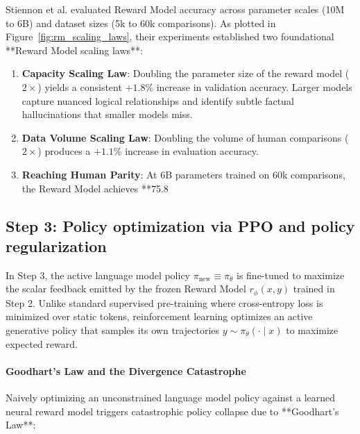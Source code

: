 \documentclass[../../main.tex]{subfiles}
\begin{document}
Stiennon et al. evaluated Reward Model accuracy across parameter scales (10M to 6B) and dataset sizes (5k to 60k comparisons). As plotted in Figure~\ref{fig:rm_scaling_laws}, their experiments established two foundational **Reward Model scaling laws**:
\begin{enumerate}
    \item \textbf{Capacity Scaling Law}: Doubling the parameter size of the reward model ($2\times$) yields a consistent $\mathbf{+1.8\%}$ increase in validation accuracy. Larger models capture nuanced logical relationships and identify subtle factual hallucinations that smaller models miss.
    \item \textbf{Data Volume Scaling Law}: Doubling the volume of human comparisons ($2\times$) produces a $\mathbf{+1.1\%}$ increase in evaluation accuracy.
    \item \textbf{Reaching Human Parity}: At 6B parameters trained on 60k comparisons, the Reward Model achieves **75.8%
\end{enumerate}

\subsection{Step 3: Policy optimization via PPO and policy regularization}
\label{subsec:step3_ppo_policy_optimization}

In Step 3, the active language model policy $\pi_{\text{new}} \equiv \pi_\theta$ is fine-tuned to maximize the scalar feedback emitted by the frozen Reward Model $r_\phi(x, y)$ trained in Step 2. Unlike standard supervised pre-training where cross-entropy loss is minimized over static tokens, reinforcement learning optimizes an active generative policy that samples its own trajectories $y \sim \pi_\theta(\cdot \mid x)$ to maximize expected reward.

\paragraph{Goodhart's Law and the Divergence Catastrophe}
Naively optimizing an unconstrained language model policy against a learned neural reward model triggers catastrophic policy collapse due to **Goodhart's Law**:
\end{document}
